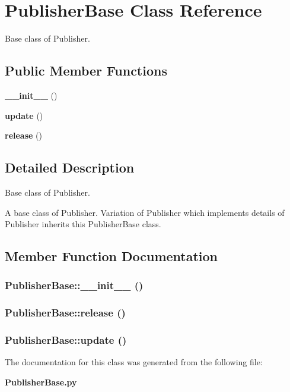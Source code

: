 \section{Publisher\-Base Class Reference}
\label{classPublisherBase}
Base class of Publisher.  


\subsection*{Public Member Functions}
\begin{CompactItemize}
\item 
{\bf \_\-\_\-init\_\-\_\-} ()
\item 
{\bf update} ()
\item 
{\bf release} ()
\end{CompactItemize}


\subsection{Detailed Description}
Base class of Publisher. 

A base class of Publisher. Variation of Publisher which implements details of Publisher inherits this Publisher\-Base class.



\subsection{Member Function Documentation}
\subsubsection{\setlength{\rightskip}{0pt plus 5cm}Publisher\-Base::\_\-\_\-init\_\-\_\- ()}\label{classPublisherBase_PublisherBasea0}


\subsubsection{\setlength{\rightskip}{0pt plus 5cm}Publisher\-Base::release ()}\label{classPublisherBase_PublisherBasea2}


\subsubsection{\setlength{\rightskip}{0pt plus 5cm}Publisher\-Base::update ()}\label{classPublisherBase_PublisherBasea1}




The documentation for this class was generated from the following file:\begin{CompactItemize}
\item 
{\bf Publisher\-Base.py}\end{CompactItemize}
